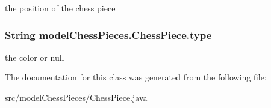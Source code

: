 the position of the chess piece \hypertarget{classmodel_chess_pieces_1_1_chess_piece_a195487ca88c197af7c1604247be31db2}{
\subsubsection[{type}]{\setlength{\rightskip}{0pt plus 5cm}String model\+Chess\+Pieces.\+Chess\+Piece.\+type\hspace{0.3cm}{\ttfamily [protected]}}}\label{classmodel_chess_pieces_1_1_chess_piece_a195487ca88c197af7c1604247be31db2}
the color or null 

The documentation for this class was generated from the following file\+:\begin{DoxyCompactItemize}
\item 
src/model\+Chess\+Pieces/Chess\+Piece.\+java\end{DoxyCompactItemize}

